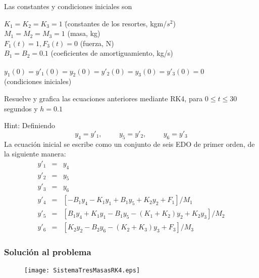 \begin{frame}
Las constantes y condiciones iniciales son
\fontsize{12}{12}\selectfont
\begin{tabbing}
$K_{1} = K_{2} = K_{3} = 1$ \hspace{1.2cm} \= (constantes de los resortes, kgm/$s^{2}$) \\
$M_{1} = M_{2} = M_{3} = 1$ \> (masa, kg) \\
$F_{1}(t) = 1, F_{3}(t) = 0$ \> (fuerza, N) \\
$B_{1} = B_{2} =0.1$ \> (coeficientes de amortiguamiento, kg/s) \\
\\
$y_{1}(0) = y'_{1}(0) = y_{2}(0) = y'_{2}(0) = y_{3}(0) = y'_{3}(0) = 0$ \\
\> (condiciones iniciales)
\end{tabbing}
Resuelve y grafica las ecuaciones anteriores mediante RK4, para $0 \leq t \leq 30$ segundos y $h=0.1$ \\
\end{frame}
\begin{frame}
Hint: Definiendo
\[ y_{4} = y'_{1}, \hspace{1cm} y_{5} = y'_{2}, \hspace{1cm} y_{6} = y'_{3} \]
La ecuación inicial se escribe como un conjunto de seis EDO de primer orden, de la siguiente manera:
\begin{eqnarray*}
y'_{1} & = & y_{4} \\
y'_{2} & = & y_{5} \\
y'_{3} & = & y_{6} \\
y'_{4} & = & \left[ -B_{1} y_{4} - K_{1} y_{1} + B_{1} y_{5} + K_{2} y_{2} + F_{1} \right] / M_{1} \\
y'_{5} & = & \left[ B_{1} y_{4} + K_{1} y_{1} - B_{1} y_{5} - \left( K_{1} + K_{2} \right) y_{2} + K_{2} y_{3} \right] / M_{2}\\
y'_{6} & = & \left[ K_{2} y_{2} - B_{2} y_{6} - \left( K_{2} + K_{3} \right)y_{3} + F_{3} \right] / M_{3}
\end{eqnarray*}
\end{frame}
\begin{frame}[fragile]
\frametitle{Solución al problema}
\begin{figure}
	\centering
	\texttt{[image: SistemaTresMasasRK4.eps]} 
\end{figure}
\end{frame}
